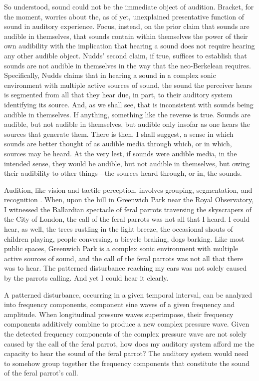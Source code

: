 So understood, sound could not be the immediate object of audition. Bracket, for the moment, worries about the, as of yet, unexplained presentative function of sound in auditory experience. Focus, instead, on the prior claim that sounds are audible in themselves, that sounds contain within themselves the power of their own audibility with the implication that hearing a sound does not require hearing any other audible object. Nudds' second claim, if true, suffices to establish that sounds are not audible in themselves in the way that the neo-Berkelean requires. Specifically, Nudds claims that in hearing a sound in a complex sonic environment with multiple active sources of sound, the sound the perceiver hears is segmented from all that they hear due, in part, to their auditory system identifying its source. And, as we shall see, that is inconsistent with sounds being audible in themselves. If anything, something like the reverse is true. Sounds are audible, but not audible in themselves, but audible only insofar as one hears the sources that generate them. There is then, I shall suggest, a sense in which sounds are better thought of as audible media through which, or in which, sources may be heard. At the very lest, if sounds were audible media, in the intended sense, they would be audible, but not audible in themselves, but owing their audibility to other things---the sources heard through, or in, the sounds.

Audition, like vision and tactile perception, involves grouping, segmentation, and recognition \citep{Bregman:1990aa}. When, upon the hill in Greenwich Park near the Royal Observatory, I witnessed the Ballardian spectacle of feral parrots traversing the skyscrapers of the City of London, the call of the feral parrots was not all that I heard. I could hear, as well, the trees rustling in the light breeze, the occasional shouts of children playing, people conversing, a bicycle braking, dogs barking. Like most public spaces, Greenwich Park is a complex sonic environment with multiple active sources of sound, and the call of the feral parrots was not all that there was to hear. The patterned disturbance reaching my ears was not solely caused by the parrots calling. And yet I could hear it clearly.

A patterned disturbance, occurring in a given temporal interval, can be analyzed into frequency components, component sine waves of a given frequency and amplitude. When longitudinal pressure waves superimpose, their frequency components additively combine to produce a new complex pressure wave. Given the detected frequency components of the complex pressure wave are not solely caused by the call of the feral parrot, how does my auditory system afford me the capacity to hear the sound of the feral parrot? The auditory system would need to somehow group together the frequency components that constitute the sound of the feral parrot's call.

